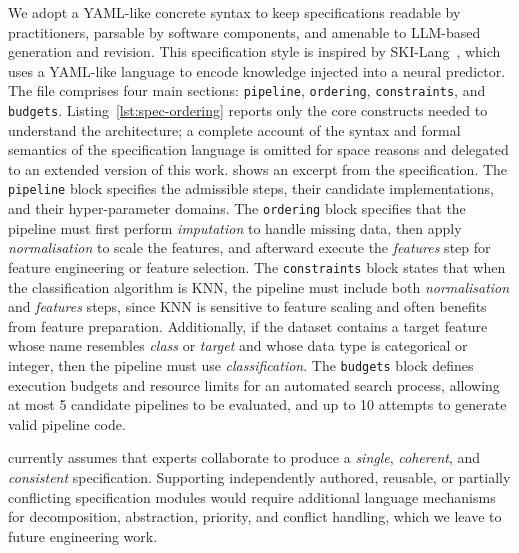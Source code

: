 \documentclass[runningheads]{llncs}
\begin{document}
We adopt a YAML-like concrete syntax to keep specifications readable by practitioners,
parsable by software components,
and
amenable to \ac{LLM}-based generation and revision.
%
This specification style is inspired by SKI-Lang~\cite{skilang}, 
which uses a YAML-like language to encode knowledge injected into a neural predictor.
%
The file comprises four main sections:
\texttt{pipeline},
\texttt{ordering},
\texttt{constraints},
and
\texttt{budgets}.
%
Listing~\ref{lst:spec-ordering} reports only the core constructs needed to understand the architecture; 
a complete account of the syntax and formal semantics of the specification language is omitted for space reasons 
and delegated to an extended version of this work.
%
 shows an excerpt from the specification.
%
The \texttt{pipeline} block specifies the admissible steps, their candidate implementations, and their hyper-parameter domains.
%
The \texttt{ordering} block specifies that the pipeline must first perform \textit{imputation} to handle missing data, 
then apply \textit{normalisation} to scale the features, 
and afterward execute the \textit{features} step for feature engineering or feature selection.
%
The \texttt{constraints} block states that when the classification algorithm is KNN, 
the pipeline must include both \textit{normalisation} and \textit{features} steps, 
since KNN is sensitive to feature scaling and often benefits from feature preparation.
%
Additionally, 
if the dataset contains a target feature whose name resembles \textit{class} or \textit{target} and whose data type is categorical or integer, then the pipeline must use \textit{classification}.
%
The \texttt{budgets} block defines execution budgets and resource limits for an automated search process, allowing at most 5 candidate pipelines to be evaluated, and up to 10 attempts to generate valid pipeline code.

\ourapproach{} currently assumes that experts collaborate to produce a \emph{single}, \emph{coherent}, and \emph{consistent} specification.
%
Supporting independently authored, reusable, or partially conflicting specification modules would require additional language mechanisms for decomposition, abstraction, priority, and conflict handling, which we leave to future engineering work.
\end{document}
